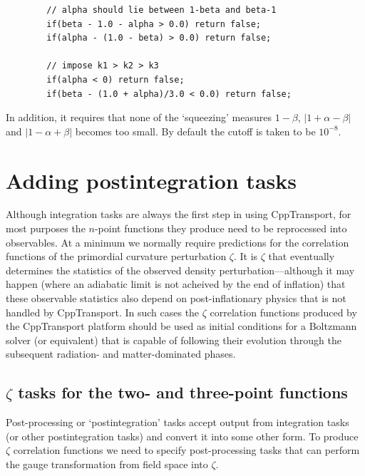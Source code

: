 \documentclass[11pt,a4paper]{article}
\newcommand{\packagefont}{\sffamily}
\newcommand{\CppTransport}{{\packagefont CppTransport}}
\begin{document}
\begin{itemize}
\begin{verbatim}
        // alpha should lie between 1-beta and beta-1
        if(beta - 1.0 - alpha > 0.0) return false;
        if(alpha - (1.0 - beta) > 0.0) return false;

        // impose k1 > k2 > k3
        if(alpha < 0) return false;
        if(beta - (1.0 + alpha)/3.0 < 0.0) return false;
    \end{verbatim}
    In addition, it requires that none of the `squeezing' measures
    $1-\beta$,
    $|1+\alpha-\beta|$ and
    $|1-\alpha+\beta|$ becomes too small.
    By default the cutoff is taken to be $10^{-8}$.
    
\end{itemize}

\section{Adding postintegration tasks}
\label{sec:post-integration-tasks}
Although integration tasks are always the first step in using {\CppTransport},
for most purposes the $n$-point functions they produce need to be reprocessed
into observables.
At a minimum we normally require predictions for the correlation functions of
the primordial curvature perturbation
$\zeta$.
It is $\zeta$ that eventually determines the statistics of the
observed density perturbation---although it may happen
(where an adiabatic limit is not acheived by the end of inflation)
that
these observable statistics
also depend on post-inflationary
physics that is not handled by {\CppTransport}.
In such cases the $\zeta$ correlation functions produced by
the {\CppTransport} platform should be used as initial
conditions for a Boltzmann solver (or equivalent)
that is capable of following their evolution through the
subsequent radiation- and matter-dominated phases.

\subsection{$\zeta$ tasks for the two- and three-point functions}
Post-processing or `postintegration' tasks accept output
from integration tasks (or other postintegration tasks)
and convert it into some other form.
To produce $\zeta$ correlation functions we need to specify
post-processing tasks that can perform the gauge transformation
from field space into $\zeta$.
\end{document}
